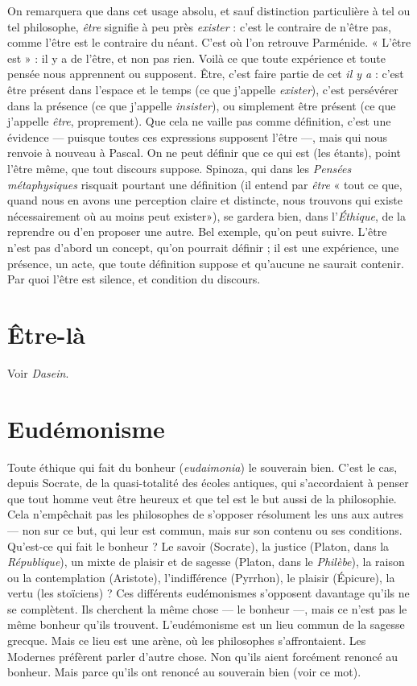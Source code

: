 On remarquera que dans cet usage absolu, et sauf distinction particulière à
tel ou tel philosophe, {\it être} signifie à peu près {\it exister} : c’est le contraire de n’être
pas, comme l'être est le contraire du néant. C’est où l’on retrouve Parménide.
« L’être est » : il y a de l’être, et non pas rien. Voilà ce que toute expérience et
toute pensée nous apprennent ou supposent. Être, c’est faire partie de cet {\it il y
a} : c'est être présent dans l’espace et le temps (ce que j'appelle {\it exister}), c’est persévérer
dans la présence (ce que j’appelle {\it insister}), ou simplement être présent
(ce que j'appelle {\it être}, proprement). Que cela ne vaille pas comme définition,
c'est une évidence — puisque toutes ces expressions supposent l'être —, mais qui
nous renvoie à nouveau à Pascal. On ne peut définir que ce qui est (les étants),
point l'être même, que tout discours suppose. Spinoza, qui dans les {\it Pensées
métaphysiques} risquait pourtant une définition (il entend par {\it être} « tout ce que,
quand nous en avons une perception claire et distincte, nous trouvons qui
existe nécessairement où au moins peut exister»), se gardera bien, dans
l’{\it Éthique}, de la reprendre ou d’en proposer une autre. Bel exemple, qu’on peut
suivre. L’être n’est pas d’abord un concept, qu’on pourrait définir ; il est une
expérience, une présence, un acte, que toute définition suppose et qu'aucune
ne saurait contenir. Par quoi l'être est silence, et condition du discours.

\section{Être-là}
Voir {\it Dasein}.

\section{Eudémonisme}
Toute éthique qui fait du bonheur ({\it eudaimonia}) le souverain
bien. C’est le cas, depuis Socrate, de la quasi-totalité
des écoles antiques, qui s’accordaient à penser que tout homme veut être
heureux et que tel est le but aussi de la philosophie. Cela n’empêchait pas les
philosophes de s'opposer résolument les uns aux autres — non sur ce but, qui
leur est commun, mais sur son contenu ou ses conditions. Qu'est-ce qui fait le
bonheur ? Le savoir (Socrate), la justice (Platon, dans la {\it République}), un mixte
de plaisir et de sagesse (Platon, dans le {\it Philèbe}), la raison ou la contemplation
(Aristote), l'indifférence (Pyrrhon), le plaisir (Épicure), la vertu (les stoïciens) ?
Ces différents eudémonismes s'opposent davantage qu’ils ne se complètent. Ils
cherchent la même chose — le bonheur —, mais ce n’est pas le même bonheur
qu'ils trouvent. L’eudémonisme est un lieu commun de la sagesse grecque.
Mais ce lieu est une arène, où les philosophes s’affrontaient. Les Modernes préfèrent
parler d’autre chose. Non qu’ils aient forcément renoncé au bonheur.
Mais parce qu’ils ont renoncé au souverain bien (voir ce mot).

